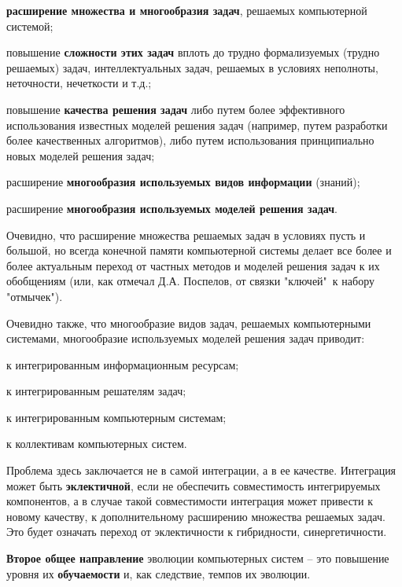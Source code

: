 \begin{SCn}
{\begin{scnitemize}
    \item \textbf{расширение множества и многообразия задач}, решаемых компьютерной системой; 
    \item повышение \textbf{сложности этих задач} вплоть до трудно формализуемых (трудно решаемых) задач, интеллектуальных задач, решаемых в условиях неполноты, неточности, нечеткости и т.д.;
    \item повышение \textbf{качества решения задач} либо путем более эффективного использования известных моделей решения задач (например, путем разработки более качественных алгоритмов), либо путем использования принципиально новых моделей решения задач;
    \item расширение \textbf{многообразия используемых видов информации} (знаний);
    \item расширение \textbf{многообразия используемых моделей решения задач}.
\end{scnitemize}

Очевидно, что расширение множества решаемых задач в условиях пусть и большой, но всегда конечной памяти компьютерной системы делает все более и более актуальным переход от частных методов и моделей решения задач к их обобщениям (или, как отмечал Д.А. Поспелов, от связки "ключей"\ к набору "отмычек").

Очевидно также, что многообразие видов задач, решаемых компьютерными системами, многообразие используемых моделей решения задач приводит: 
\begin{scnitemize}
    \item к интегрированным информационным ресурсам;
    \item к интегрированным решателям задач;
    \item к интегрированным компьютерным системам;
    \item к коллективам компьютерных систем.
\end{scnitemize}

Проблема здесь заключается не в самой интеграции, а в ее качестве. Интеграция может быть \textbf{эклектичной}, если не обеспечить совместимость интегрируемых компонентов, а в случае такой совместимости интеграция может привести к новому качеству, к дополнительному расширению множества решаемых задач. Это будет означать переход от эклектичности к гибридности, синергетичности.

\textbf{Второе общее направление} эволюции компьютерных систем -- это повышение уровня их \textbf{обучаемости} и, как следствие, темпов их эволюции.

}
\end{SCn}

